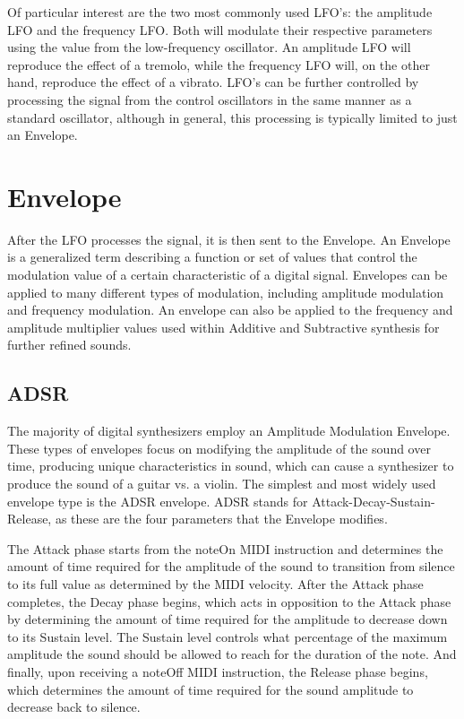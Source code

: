 \documentclass[a4paper,12pt]{report}
\begin{document}
Of particular interest are the two most commonly used LFO's: the amplitude LFO and the frequency LFO. Both will modulate their respective parameters using the value from the low-frequency oscillator. An amplitude LFO will reproduce the effect of a tremolo, while the frequency LFO will, on the other hand, reproduce the effect of a vibrato. LFO's can be further controlled by processing the signal from the control oscillators in the same manner as a standard oscillator, although in general, this processing is typically limited to just an Envelope.

\section{Envelope}
\label{sec:env}
After the LFO processes the signal, it is then sent to the Envelope. An Envelope is a generalized term describing a function or set of values that control the modulation value of a certain characteristic of a digital signal. Envelopes can be applied to many different types of modulation, including amplitude modulation and frequency modulation. An envelope can also be applied to the frequency and amplitude multiplier values used within Additive and Subtractive synthesis for further refined sounds.

\subsection{ADSR}
\label{subsec:adsr}
The majority of digital synthesizers employ an Amplitude Modulation Envelope. These types of envelopes focus on modifying the amplitude of the sound over time, producing unique characteristics in sound, which can cause a synthesizer to produce the sound of a guitar vs. a violin. The simplest and most widely used envelope type is the ADSR envelope. ADSR stands for Attack-Decay-Sustain-Release, as these are the four parameters that the Envelope modifies.

The Attack phase starts from the noteOn MIDI instruction and determines the amount of time required for the amplitude of the sound to transition from silence to its full value as determined by the MIDI velocity. After the Attack phase completes, the Decay phase begins, which acts in opposition to the Attack phase by determining the amount of time required for the amplitude to decrease down to its Sustain level. The Sustain level controls what percentage of the maximum amplitude the sound should be allowed to reach for the duration of the note. And finally, upon receiving a noteOff MIDI instruction, the Release phase begins, which determines the amount of time required for the sound amplitude to decrease back to silence.
\end{document}
